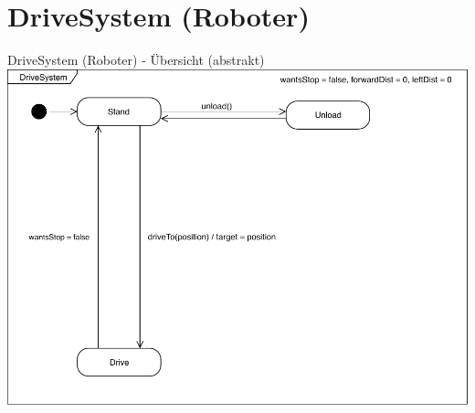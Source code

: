 \documentclass{beamer}
\begin{document}
\section{DriveSystem (Roboter)}
\begin{frame}{DriveSystem (Roboter) - Übersicht (abstrakt)}
\centering
\includegraphics[height=0.75\textheight]{PDF/MiniDriveSystem.pdf}
\end{frame}
\end{document}
